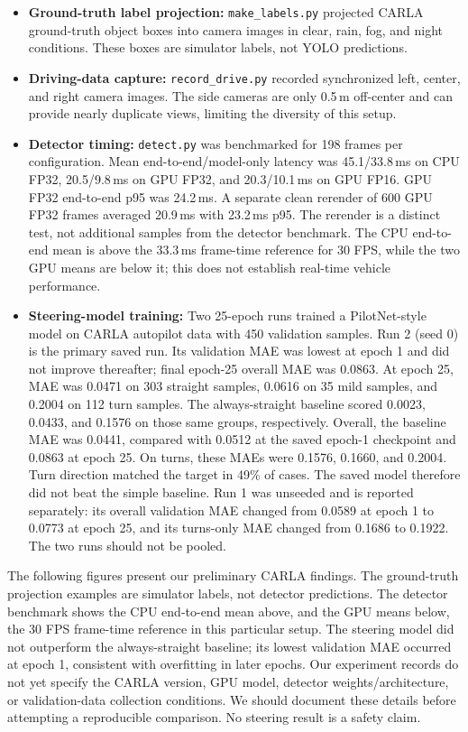 \documentclass[12pt,a4paper,oneside]{report}
\begin{document}
\begin{itemize}
  \item \textbf{Ground-truth label projection:} \texttt{make\_labels.py}
  projected CARLA ground-truth object boxes into camera images in clear,
  rain, fog, and night conditions. These boxes are simulator labels, not
  YOLO predictions.
  \item \textbf{Driving-data capture:} \texttt{record\_drive.py} recorded
  synchronized left, center, and right camera images. The side cameras are
  only 0.5\,m off-center and can provide nearly duplicate views, limiting
  the diversity of this setup.
  \item \textbf{Detector timing:} \texttt{detect.py} was benchmarked for
  198 frames per configuration. Mean end-to-end/model-only latency was
  45.1/33.8\,ms on CPU FP32, 20.5/9.8\,ms on GPU FP32, and 20.3/10.1\,ms on
  GPU FP16. GPU FP32 end-to-end p95 was 24.2\,ms. A separate clean rerender
  of 600 GPU FP32 frames averaged 20.9\,ms with 23.2\,ms p95. The rerender
  is a distinct test, not additional samples from the detector benchmark.
  The CPU end-to-end mean is above the 33.3\,ms frame-time reference for
  30 FPS, while the two GPU means are below it; this does not establish
  real-time vehicle performance.
  \item \textbf{Steering-model training:} Two 25-epoch runs trained a
  PilotNet-style model on CARLA autopilot data with 450 validation samples.
  Run 2 (seed 0) is the primary saved run. Its validation MAE was lowest at
  epoch 1 and did not improve thereafter; final epoch-25 overall MAE was
  0.0863. At epoch 25, MAE was 0.0471 on 303 straight samples, 0.0616 on
  35 mild samples, and 0.2004 on 112 turn samples. The always-straight
  baseline scored 0.0023, 0.0433, and 0.1576 on those same groups,
  respectively. Overall, the baseline MAE was 0.0441, compared with 0.0512
  at the saved epoch-1 checkpoint and 0.0863 at epoch 25. On turns, these
  MAEs were 0.1576, 0.1660, and 0.2004. Turn direction matched the target
  in 49\% of cases. The saved model therefore did not beat the simple
  baseline. Run 1 was unseeded and is reported separately: its overall
  validation MAE changed from 0.0589 at epoch 1 to 0.0773 at epoch 25, and
  its turns-only MAE changed from 0.1686 to 0.1922. The two runs should not
  be pooled.
\end{itemize}

The following figures present our preliminary CARLA findings. The
ground-truth projection examples are simulator labels, not detector predictions. The
detector benchmark shows the CPU end-to-end mean above, and the GPU means
below, the 30 FPS frame-time reference in this particular setup. The
steering model did not outperform the
always-straight baseline; its lowest validation MAE occurred at epoch 1,
consistent with overfitting in later epochs. Our experiment records do not
yet specify the CARLA version, GPU model, detector weights/architecture, or
validation-data collection conditions. We should document these details
before attempting a reproducible comparison. No steering result is a
safety claim.
\end{document}
